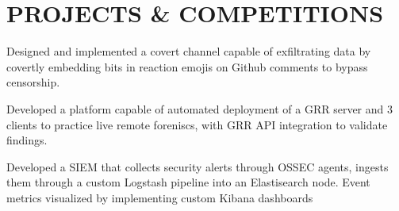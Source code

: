 \documentclass[letterpaper]{deedy-resume} %
\begin{document}
\begin{minipage}[t]{0.66\textwidth}
\sectionspace %



\section{PROJECTS \& COMPETITIONS}



Designed and implemented a covert channel capable of exfiltrating data by covertly embedding bits in reaction emojis on Github comments to bypass censorship.

\sectionspace %





Developed a platform capable of automated deployment of a GRR server and 3 clients to practice live remote foreniscs, with GRR API integration to validate findings.

\sectionspace %




Developed a SIEM that collects security alerts through OSSEC agents, ingests them through a custom Logstash pipeline into an Elastisearch node. Event metrics visualized by implementing custom Kibana dashboards


\end{minipage}
\end{document}
